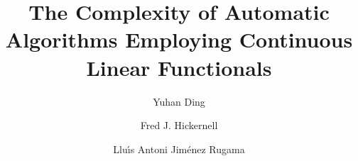 \documentclass[final]{elsarticle}
\theoremstyle{definition}
\theoremstyle{remark}
\begin{document}
\begin{frontmatter}

\title{The Complexity of Automatic Algorithms Employing Continuous Linear Functionals}
\author{Yuhan Ding}
\address{MCA 310, Department of Mathematics, Misericordia University,\\ 301 Lake St., Dallas, PA, 18612}
\author{Fred J. Hickernell}
\address{Pritzker Science Ctr Rm 106, Center for Interdisciplinary Scientific Computation, \\3105 S Dearborn St, Chicago, IL 60616}
\author{Llu\'{\i}s Antoni Jim\'{e}nez Rugama}
\address{Room E1-120, Department of Applied Mathematics, Illinois Institute of Technology,\\ 10 W.\ 32$^{\text{nd}}$ St., Chicago, IL 60616}
\begin{abstract}
\end{abstract}

\begin{keyword}


\end{keyword}
\end{frontmatter}
\end{document}
